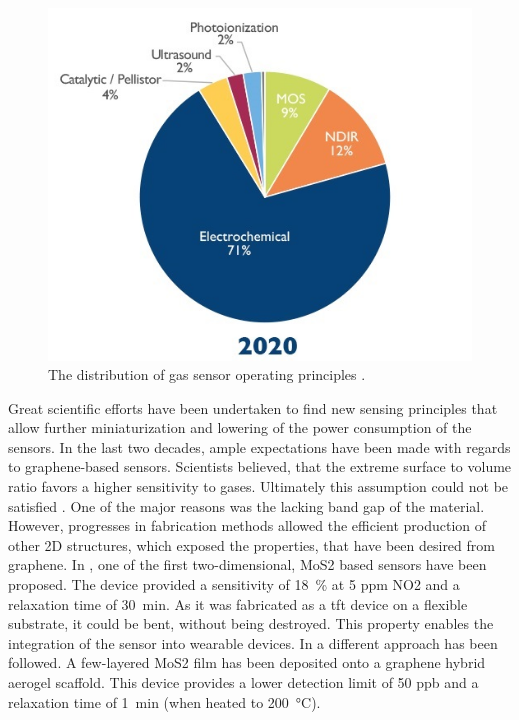 \begin{figure}
\centering
    \includegraphics[width=.5\textwidth]{01_introduction/fig/gas_sensor_distribution.jpg}
    \caption{The distribution of gas sensor operating principles \cite{yole2021}.}
    \label{fig:gas_sensor_distribution}
\end{figure}
Great scientific efforts have been undertaken to find new sensing principles that allow further miniaturization and lowering of the power consumption of the sensors. In the last two decades, ample expectations have been made with regards to graphene-based sensors. Scientists believed, that the extreme surface to volume ratio favors a higher sensitivity to gases. Ultimately this assumption could not be satisfied \cite{Geim2013}. One of the major reasons was the lacking band gap of the material. However, progresses in fabrication methods allowed the efficient production of other 2D structures, which exposed the properties, that have been desired from graphene. In \cite{He2012}, one of the first two-dimensional, MoS2 based sensors have been proposed. The device provided a sensitivity of \SI{18}{\percent} at 5 ppm NO2 and a relaxation time of \SI{30}{\minute}. As it was fabricated as a \gls{tft} device on a flexible substrate, it could be bent, without being destroyed. This property enables the integration of the sensor into wearable devices. In \cite{Long2016} a different approach has been followed. A few-layered MoS2 film has been deposited onto a graphene hybrid aerogel scaffold. This device provides a lower detection limit of 50 ppb and a relaxation time of \SI{1}{\minute} (when heated to \SI{200}{\celsius}). \\
